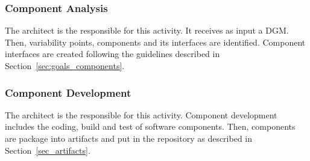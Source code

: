 \subsubsection{Component Analysis}

The architect is the responsible for this activity. It receives as input a DGM. Then, variability points, components and its interfaces are identified. Component interfaces are created following the guidelines described in Section~\ref{sec:goals_components}.

\subsubsection{Component Development}

The architect is the responsible for this activity. Component development includes the coding, build and test of software components.
Then, components are package into artifacts and put in the repository as described in Section~\ref{sec_artifacts}.
